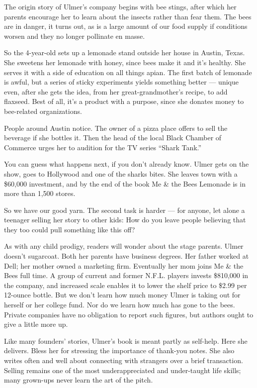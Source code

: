 The origin story of Ulmer's company begins with bee stings, after which
her parents encourage her to learn about the insects rather than fear
them. The bees are in danger, it turns out, as is a large amount of our
food supply if conditions worsen and they no longer pollinate en masse.

So the 4-year-old sets up a lemonade stand outside her house in Austin,
Texas. She sweetens her lemonade with honey, since bees make it and it's
healthy. She serves it with a side of education on all things apian. The
first batch of lemonade is awful, but a series of sticky experiments
yields something better --- unique even, after she gets the idea, from
her great-grandmother's recipe, to add flaxseed. Best of all, it's a
product with a purpose, since she donates money to bee-related
organizations.

People around Austin notice. The owner of a pizza place offers to sell
the beverage if she bottles it. Then the head of the local Black Chamber
of Commerce urges her to audition for the TV series ``Shark Tank.''

You can guess what happens next, if you don't already know. Ulmer gets
on the show, goes to Hollywood and one of the sharks bites. She leaves
town with a \$60,000 investment, and by the end of the book Me \& the
Bees Lemonade is in more than 1,500 stores.

So we have our good yarn. The second task is harder --- for anyone, let
alone a teenager selling her story to other kids: How do you leave
people believing that they too could pull something like this off?

As with any child prodigy, readers will wonder about the stage parents.
Ulmer doesn't sugarcoat. Both her parents have business degrees. Her
father worked at Dell; her mother owned a marketing firm. Eventually her
mom joins Me \& the Bees full time. A group of current and former N.F.L.
players invests \$810,000 in the company, and increased scale enables it
to lower the shelf price to \$2.99 per 12-ounce bottle. But we don't
learn how much money Ulmer is taking out for herself or her college
fund. Nor do we learn how much has gone to the bees. Private companies
have no obligation to report such figures, but authors ought to give a
little more up.

Like many founders' stories, Ulmer's book is meant partly as self-help.
Here she delivers. Bless her for stressing the importance of thank-you
notes. She also writes often and well about connecting with strangers
over a brief transaction. Selling remains one of the most
underappreciated and under-taught life skills; many grown-ups never
learn the art of the pitch.


